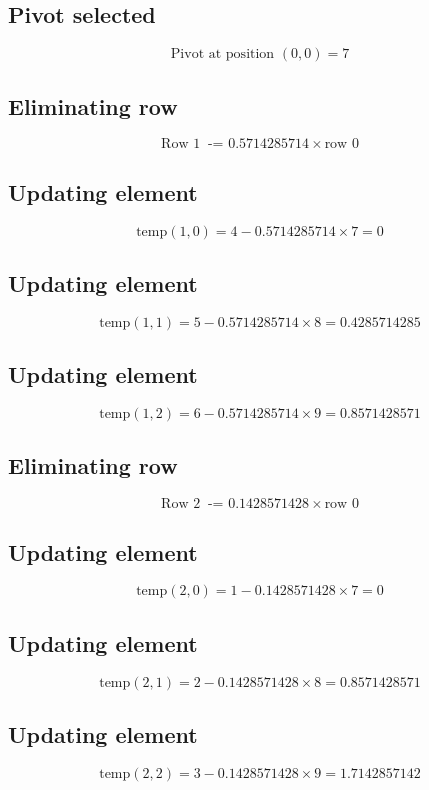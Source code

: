 \documentclass{article}
\begin{document}
\subsection*{ \vspace{1em} Pivot selected}
\[
\text{Pivot at position } ( 0,0 ) = 7
\]
\subsection*{ \vspace{1em} Eliminating row}
\[
\text{Row } 1\ \text{ -= } 0.5714285714 \times \text{row } 0
\]
\subsection*{ \vspace{1em} Updating element}
\[
\text{temp}( 1,0 ) = 4 - 0.5714285714 \times 7 = 0
\]
\subsection*{ \vspace{1em} Updating element}
\[
\text{temp}( 1,1 ) = 5 - 0.5714285714 \times 8 = 0.4285714285
\]
\subsection*{ \vspace{1em} Updating element}
\[
\text{temp}( 1,2 ) = 6 - 0.5714285714 \times 9 = 0.8571428571
\]
\subsection*{ \vspace{1em} Eliminating row}
\[
\text{Row } 2\ \text{ -= } 0.1428571428 \times \text{row } 0
\]
\subsection*{ \vspace{1em} Updating element}
\[
\text{temp}( 2,0 ) = 1 - 0.1428571428 \times 7 = 0
\]
\subsection*{ \vspace{1em} Updating element}
\[
\text{temp}( 2,1 ) = 2 - 0.1428571428 \times 8 = 0.8571428571
\]
\subsection*{ \vspace{1em} Updating element}
\[
\text{temp}( 2,2 ) = 3 - 0.1428571428 \times 9 = 1.7142857142
\]
\end{document}
